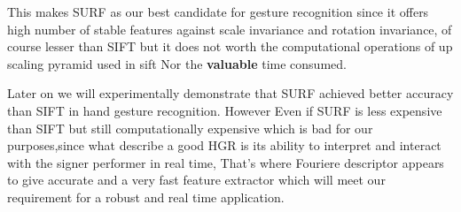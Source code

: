 This makes SURF as our best candidate for gesture recognition  since it offers high number of stable features against scale invariance and rotation invariance, of course lesser than SIFT but it does not worth the computational operations of up scaling pyramid used in sift Nor the \textbf{valuable }time consumed.

Later on we will experimentally demonstrate that SURF achieved  better accuracy than SIFT in hand gesture recognition. However Even if SURF is less expensive than SIFT but still computationally expensive which is bad for our purposes,since what describe a good HGR is its ability to interpret  and interact with the signer performer in real time, That's where Fouriere descriptor appears to give accurate and a very fast feature extractor which will meet our requirement for a robust and real time application.


